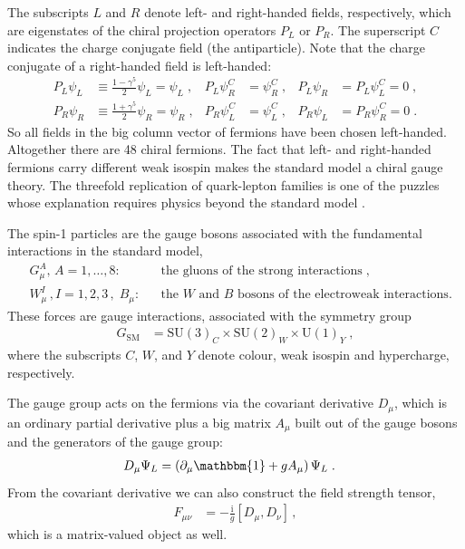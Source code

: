\documentclass[12pt]{report}
\newcommand{\ls}{{\ensuremath{\scriptscriptstyle L}}}
\newcommand{\rs}{{\ensuremath{\scriptscriptstyle R}}}
\newcommand{\cs}{{\ensuremath{\scriptscriptstyle C}}}
\renewcommand{\i}{\ensuremath{\text{i}}}
\newcommand{\2}{\ensuremath{\sqrt{2}\,}}
\begin{document}
    The subscripts $L$ and $R$ denote left- and right-handed fields, respectively,
    which are eigenstates of the chiral projection operators $P_L$ or $P_R$. The superscript $C$
    indicates the charge conjugate field (the antiparticle).  Note that the charge conjugate of a
    right-handed field is left-handed:
    \begin{align}
      P_L \psi_\ls&\equiv \frac{1-\gamma^5}{2} \psi_\ls = \psi_\ls\;, &
      P_L\psi_\rs^\cs &=\psi_\rs^\cs\;,  & P_L \psi_\rs &=  P_L\psi_\ls^\cs=0\;,\\
      P_R \psi_\rs&\equiv \frac{1+\gamma^5}{2} \psi_\rs = \psi_\rs\;, &
      P_R\psi_\ls^\cs &=\psi_\ls^\cs\;,   & P_R \psi_\ls &= P_R \psi_\rs^\cs=0\;.
    \end{align}
    So all fields in the big column vector of fermions have been chosen left-handed. Altogether there are 48
    chiral fermions. The fact that left- and right-handed fermions carry different
    weak isospin makes the standard model a chiral gauge theory. The threefold replication of
    quark-lepton families is one of the puzzles whose explanation requires physics beyond the
    standard model \cite{ellis}.

    The spin-1 particles are the gauge bosons associated with the fundamental interactions in the
    standard model, 
    \begin{align}
      &G_\mu^A, \, A=1,\dotsc,8: && \text{the gluons of the strong interactions}\;,\\
      &       W^I_\mu \,, I=1,2,3\,,\; B_\mu:
      && \text{the $W$ and $B$ bosons of the electroweak interactions.}
    \end{align}
    These forces are gauge interactions, associated with the symmetry group
    \begin{align}
      G_\text{SM}&=\mathrm{SU(3)}_C\times \mathrm{SU(2)}_W \times \mathrm{U(1)}_Y \; ,
    \end{align}
    where the subscripts $C$, $W$, and $Y$ denote colour, weak isospin and hypercharge, respectively.

    The gauge group acts on the fermions via the covariant derivative $D_\mu$, which is an ordinary
    partial derivative plus a big matrix $A_\mu$ built out of the gauge bosons and the generators of
    the gauge group:
    \begin{align}
      D_\mu \Psi_L &= \left(\partial_\mu \mathbbm{1} + g A_\mu \right)\Psi_L\;.
    \end{align}
    From the covariant derivative we can also construct the field strength tensor,
    \begin{align}
      F_{\mu\nu}&= -\frac{\i}{g} \left[ D_\mu, D_\nu\right]\, ,
    \end{align}
    which is a matrix-valued object as well.
\end{document}
